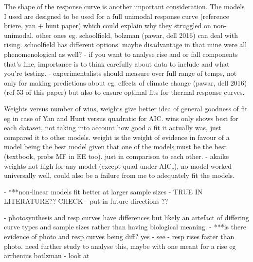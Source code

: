 \documentclass[11pt, a4paper]{article}
\begin{document}
The shape of the response curve is another important consideration. The models I used are designed to be used for a full unimodal response curve (reference briere, yan + hunt paper) which could explain why they struggled on non-unimodal. other ones eg. schoolfield, bolzman (pawar, dell 2016) can deal with rising. schoolfield has different options. maybe disadvantage in that mine were all phenomenological as well? - if you want to analyse rise and or fall components that's fine, importance is to think carefully about data to include and what you're testing.	- experimentalists should measure over full range of temps, not only for making predictions about eg. effects of climate change (pawar, dell 2016) (ref 53 of this paper) but also to ensure optimal fits for thermal response curves. 

Weights versus number of wins, weights give better idea of general goodness of fit eg in case of Yan and Hunt versus quadratic for AIC. wins only shows best for each dataset, not taking into account how good a fit it actually was, just compared it to other models. weight is the weight of evidence in favour of a model being the best model given that one of the models must be the best (textbook, probs MF in EE too). just in comparison to each other. - akaike weights not high for any model (except quad under AIC$_c$), no model worked universally well, could also be a failure from me to adequately fit the models.

- ***non-linear models fit better at larger sample sizes - TRUE IN LITERATURE?? CHECK - put in future directions ??

- photosynthesis and resp curves have differences but likely an artefact of differing curve types and sample sizes rather than having biological meaning. 	- ***is there evidence of photo and resp curves being diff? yes - see \cite{MarineMesoherbivoreConsumption2016} - resp rises faster than photo. need further study to analyse this, maybe with one meant for a rise eg arrhenius botlzman - look at \cite{dellSystematicVariationTemperature2011}
\end{document}
